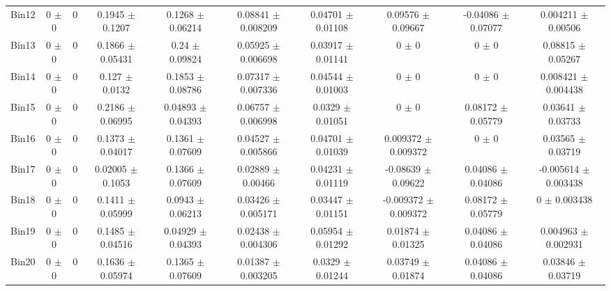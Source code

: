\begin{tabular}{@{\extracolsep{4pt}}lccccccccc@{}}
     Bin12 & 0 $\pm$ 0 & 0 & 0.1945 $\pm$ 0.1207 & 0.1268 $\pm$ 0.06214 & 0.08841 $\pm$ 0.008209 & 0.04701 $\pm$ 0.01108 & 0.09576 $\pm$ 0.09667 & -0.04086 $\pm$ 0.07077 & 0.004211 $\pm$ 0.00506 \\ 
     Bin13 & 0 $\pm$ 0 & 0 & 0.1866 $\pm$ 0.05431 & 0.24 $\pm$ 0.09824 & 0.05925 $\pm$ 0.006698 & 0.03917 $\pm$ 0.01141 & 0 $\pm$ 0 & 0 $\pm$ 0 & 0.08815 $\pm$ 0.05267 \\ 
     Bin14 & 0 $\pm$ 0 & 0 & 0.127 $\pm$ 0.0132 & 0.1853 $\pm$ 0.08786 & 0.07317 $\pm$ 0.007336 & 0.04544 $\pm$ 0.01003 & 0 $\pm$ 0 & 0 $\pm$ 0 & 0.008421 $\pm$ 0.004438 \\ 
     Bin15 & 0 $\pm$ 0 & 0 & 0.2186 $\pm$ 0.06995 & 0.04893 $\pm$ 0.04393 & 0.06757 $\pm$ 0.006998 & 0.0329 $\pm$ 0.01051 & 0 $\pm$ 0 & 0.08172 $\pm$ 0.05779 & 0.03641 $\pm$ 0.03733 \\ 
     Bin16 & 0 $\pm$ 0 & 0 & 0.1373 $\pm$ 0.04017 & 0.1361 $\pm$ 0.07609 & 0.04527 $\pm$ 0.005866 & 0.04701 $\pm$ 0.01039 & 0.009372 $\pm$ 0.009372 & 0 $\pm$ 0 & 0.03565 $\pm$ 0.03719 \\ 
     Bin17 & 0 $\pm$ 0 & 0 & 0.02005 $\pm$ 0.1053 & 0.1366 $\pm$ 0.07609 & 0.02889 $\pm$ 0.00466 & 0.04231 $\pm$ 0.01119 & -0.08639 $\pm$ 0.09622 & 0.04086 $\pm$ 0.04086 & -0.005614 $\pm$ 0.003438 \\ 
     Bin18 & 0 $\pm$ 0 & 0 & 0.1411 $\pm$ 0.05999 & 0.0943 $\pm$ 0.06213 & 0.03426 $\pm$ 0.005171 & 0.03447 $\pm$ 0.01151 & -0.009372 $\pm$ 0.009372 & 0.08172 $\pm$ 0.05779 & 0 $\pm$ 0.003438 \\ 
     Bin19 & 0 $\pm$ 0 & 0 & 0.1485 $\pm$ 0.04516 & 0.04929 $\pm$ 0.04393 & 0.02438 $\pm$ 0.004306 & 0.05954 $\pm$ 0.01292 & 0.01874 $\pm$ 0.01325 & 0.04086 $\pm$ 0.04086 & 0.004963 $\pm$ 0.002931 \\ 
     Bin20 & 0 $\pm$ 0 & 0 & 0.1636 $\pm$ 0.05974 & 0.1365 $\pm$ 0.07609 & 0.01387 $\pm$ 0.003205 & 0.0329 $\pm$ 0.01244 & 0.03749 $\pm$ 0.01874 & 0.04086 $\pm$ 0.04086 & 0.03846 $\pm$ 0.03719 \\ 
\hline\hline
  \end{tabular}

